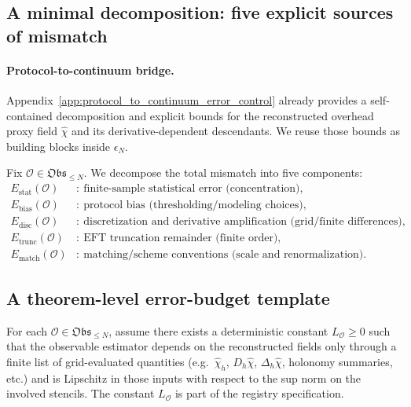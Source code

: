 \subsection{A minimal decomposition: five explicit sources of mismatch}

\paragraph{Protocol-to-continuum bridge.}
Appendix~\ref{app:protocol_to_continuum_error_control} already provides a self-contained decomposition and explicit bounds for the reconstructed overhead proxy field $\widehat\chi$ and its derivative-dependent descendants.
We reuse those bounds as building blocks inside $\epsilon_N$.

\begin{definition}\label{def:epsilon_components}
\AuditTag Fix $\mathcal{O}\in\mathfrak{Obs}_{\le N}$.
We decompose the total mismatch into five components:
\begin{align*}
E_{\mathrm{stat}}(\mathcal{O}) &:\ \text{finite-sample statistical error (concentration)},\\
E_{\mathrm{bias}}(\mathcal{O}) &:\ \text{protocol bias (thresholding/modeling choices)},\\
E_{\mathrm{disc}}(\mathcal{O}) &:\ \text{discretization and derivative amplification (grid/finite differences)},\\
E_{\mathrm{trunc}}(\mathcal{O}) &:\ \text{EFT truncation remainder (finite order)},\\
E_{\mathrm{match}}(\mathcal{O}) &:\ \text{matching/scheme conventions (scale and renormalization)}.
\end{align*}
\end{definition}

\subsection{A theorem-level error-budget template}

\begin{assumption}\label{ass:obs_lipschitz}
\AuditTag For each $\mathcal{O}\in\mathfrak{Obs}_{\le N}$, assume there exists a deterministic constant $L_{\mathcal{O}}\ge 0$ such that
the observable estimator depends on the reconstructed fields only through a finite list of grid-evaluated quantities
(e.g.\ $\widehat\chi_h$, $D_h\widehat\chi$, $\Delta_h\widehat\chi$, holonomy summaries, etc.)
and is Lipschitz in those inputs with respect to the sup norm on the involved stencils.
The constant $L_{\mathcal{O}}$ is part of the registry specification.
\end{assumption}

